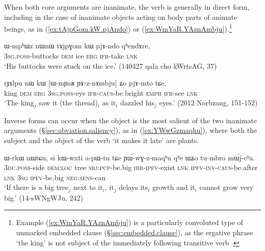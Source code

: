 When both core arguments are inanimate, the verb is generally in direct form, including in the case of inanimate objects acting on body parts of animate beings, as in (\ref{ex:tAjpGom.kW.pjAndo}) or (\ref{ex:WmYaR.YAznAmbju}).\footnote{Example (\ref{ex:WmYaR.YAznAmbju}) is a particularly convoluted type of unmarked embedded clause (§\ref{sec:embedded.clause}), as the ergative phrase  `the king' is not subject of the immediately following transitive verb . }

\begin{exe}
\ex \label{ex:tAjpGom.kW.pjAndo}
\gll ɯ-mpʰɯz nɯnɯ tɤjpɣom kɯ pjɤ-ndo qʰendɤre, \\
\textsc{3sg}.\textsc{poss}-buttocks \textsc{dem} ice \textsc{erg} \textsc{ifr}-take \textsc{lnk} \\
\glt `His buttocks were stuck on the ice.' (140427 qala cho kWrtsAG, 37)
\end{exe}

\begin{exe}
\ex \label{ex:WmYaR.YAznAmbju}
\gll  rɟɤlpu nɯ kɯ [ɯ-mɲaʁ ɲɤ-z-nɤmbju] ʑo pjɤ-mto tɕe,  \\
  king \textsc{dem} \textsc{erg} \textsc{3sg}.\textsc{poss}-eye \textsc{ifr}-\textsc{caus}-be.bright \textsc{emph} \textsc{ifr}-see \textsc{lnk} \\
\glt `The king$_j$ saw it (the thread)$_i$ as it$_i$ dazzled his$_j$ eyes.'  (2012 Norbzang, 151-152)
\end{exe}

Inverse forms can occur when the object is the most salient of the two inanimate arguments (§\ref{sec:obviation.saliency}), as in (\ref{ex:YWwGzmaqhu}), where both the subject and the object of the verb  `it makes it late' are plants.

\begin{exe}
\ex \label{ex:YWwGzmaqhu}
\gll ɯ-rkɯ nɯtɕu, si kɯ-wxti a-pɯ-tu tɕe ɲɯ́-wɣ-z-maqʰu qʰe ɯʑo tu-mbro mɯ́j-cʰa.	\\
\textsc{3du}.\textsc{poss}-side \textsc{dem}:\textsc{loc} tree \textsc{sbj}:\textsc{pcp}-be.big \textsc{irr}-\textsc{ipfv}-exist \textsc{lnk} \textsc{ipfv}-\textsc{inv}-\textsc{caus}-be.after \textsc{lnk} \textsc{3sg} \textsc{ipfv}-be.big \textsc{neg}:\textsc{sens}-can \\
\glt `If there is a big tree$_j$ next to it$_i$, it$_j$ delays its$_i$ growth and it$_i$ cannot grow very big.' (14-sWNgWJu, 242)
\end{exe}
  
